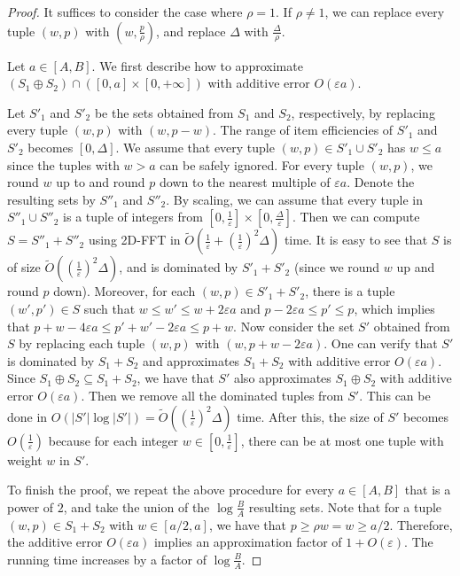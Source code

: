 \documentclass[a4paper,UKenglish,cleveref, autoref, thm-restate, pdfa]{lipics-v2021}
\newcommand{\eps}{\varepsilon}
\renewcommand{\leq}{\leqslant}
\renewcommand{\geq}{\geqslant}
\begin{document}
\begin{proof}
    It suffices to consider the case where $\rho = 1$. If $\rho \neq 1$, we can replace every tuple $(w, p)$ with $(w, \frac{p}{\rho})$, and replace $\Delta$ with $\frac{\Delta}{\rho}$. 
    
    Let $a \in [A, B]$.  We first describe how to approximate $(S_1 \oplus S_2)\cap ([0 ,a] \times [0, + \infty])$ with additive error $O(\eps a)$.

    Let $S'_1$ and $S'_2$ be the sets obtained from $S_1$ and $S_2$, respectively, by replacing every tuple $(w, p)$ with $(w, p - w)$. The range of item efficiencies of $S'_1$ and $S'_2$ becomes $[0, \Delta]$. We assume that every tuple $(w, p) \in S'_1 \cup S'_2$ has $w \leq a$ since the tuples with $w > a$ can be safely ignored. For every tuple $(w, p)$, we round $w$ up to and round $p$ down to the nearest multiple of $\eps a$. Denote the resulting sets by $S''_1$ and $S''_2$.  By scaling, we can assume that every tuple in $S''_1 \cup S''_2$ is a tuple of integers from $[0, \frac{1}{\eps}] \times [0, \frac{\Delta}{\eps}]$. Then we can compute $S = S''_1 + S''_2$ using 2D-FFT in $\tilde{O}(\frac{1}{\eps} + (\frac{1}{\eps})^2\Delta)$ time. It is easy to see that $S$ is of size $\tilde{O}((\frac{1}{\eps})^2\Delta)$, and is dominated by $S'_1 + S'_2$ (since we round $w$ up and round $p$ down). Moreover, for each $(w, p) \in S'_1 + S'_2$, there is a tuple $(w', p') \in S$ such that $w\leq w' \leq w + 2\eps a$ and $p - 2\eps a \leq p' \leq p$, which implies that $p + w - 4\eps a \leq p' + w' - 2\eps a \leq p + w$.
    Now consider the set $S'$ obtained from $S$ by replacing each tuple $(w, p)$ with $(w, p + w - 2\eps a)$. One can verify that $S'$ is dominated by $S_1 + S_2$ and approximates $S_1 + S_2$ with additive error $O(\eps a)$.  Since $S_1 \oplus S_2 \subseteq S_1 + S_2$, we have that $S'$ also approximates $S_1 \oplus S_2$ with additive error $O(\eps a)$. Then we remove all the dominated tuples from $S'$. This can be done in $O(|S'|\log |S'|) = \tilde{O}((\frac{1}{\eps})^2\Delta)$ time. After this, the size of $S'$ becomes $O(\frac{1}{\eps})$ because for each integer $w \in [0,\frac{1}{\eps}]$, there can be at most one tuple with weight $w$ in $S'$.

    To finish the proof, we repeat the above procedure for every $a \in [A, B]$ that is a power of $2$, and take the union of the $\log \frac{B}{A}$ resulting sets. Note that for a tuple $(w, p) \in S_1 + S_2$ with $w \in [a/2, a]$, we have that $p \geq \rho w = w \geq a/2$.  Therefore, the additive error $O(\eps a)$ implies an approximation factor of $1 + O(\eps)$. The running time increases by a factor of $\log \frac{B}{A}$.
\end{proof}
\end{document}
